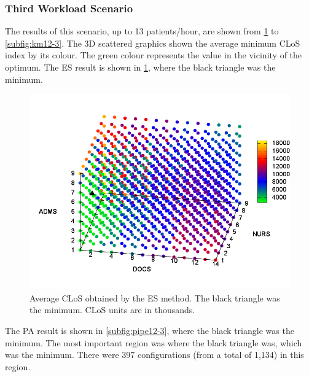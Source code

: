 \documentclass[11pt]{article} %
\begin{document}
\subsubsection{Third Workload Scenario}
 
The results of this scenario, up to 13 patients/hour, are shown from
\ref{subfig:es12-3} to \ref{subfig:km12-3}. The 3D scattered graphics
shown the average minimum CLoS index by its colour. The green colour
represents the value in the vicinity of the optimum. The ES result
is shown in \ref{subfig:es12-3}, where the black triangle was the
minimum. 

\begin{figure}[H]
\centering{}\includegraphics[width=1\columnwidth,height=0.19\paperheight]{figs4/v03/6400-602-75-Cost_times_LoS-exh-min}
\caption{Average CLoS obtained by the ES method. The black triangle was the
minimum. CLoS units are in thousands.\label{subfig:es12-3}}
\end{figure}

The PA result is shown in \ref{subfig:pipe12-3}, where the black
triangle was the minimum. The most important region was where the
black triangle was, which was the minimum. There were 397 configurations
(from a total of 1,134) in this region. 
\end{document}
